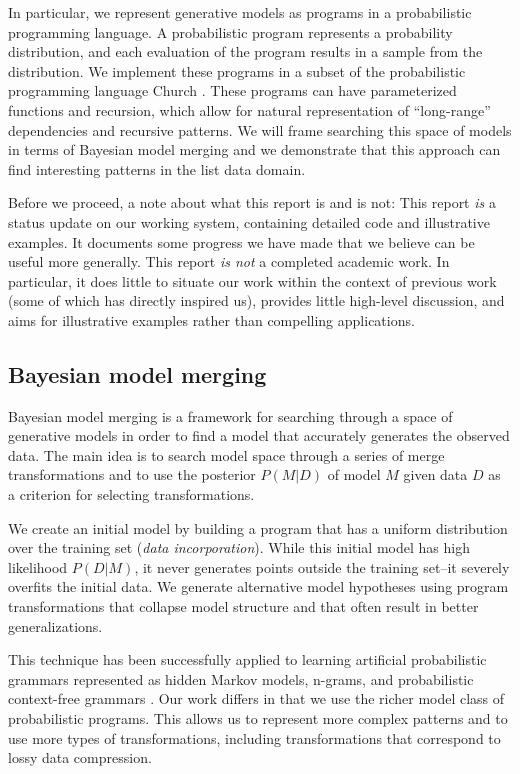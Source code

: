 \documentclass[a4paper,10pt]{article}
\begin{document}
In particular, we represent generative models as programs in a probabilistic programming language. A probabilistic program represents a probability distribution, and each evaluation of the program results in a sample from the distribution. We implement these programs in a subset of the probabilistic programming language Church \cite{N.D.Goodman:2008:f2a0d}.  
These programs can have parameterized functions and recursion, which allow for natural representation of ``long-range'' dependencies and recursive patterns.  We will frame searching this space of models in terms of Bayesian model merging \cite{Stolcke:1994:IPG:645515.658235} and we demonstrate that this approach can find interesting patterns in the list data domain.

Before we proceed, a note about what this report is and is not: This report \emph{is} a status update on our working system, containing detailed code and illustrative examples. It documents some progress we have made that we believe can be useful more generally.
This report \emph{is not} a completed academic work. In particular, it does little to situate our work within the context of previous work (some of which has  directly inspired us), provides little high-level discussion, and aims for illustrative examples rather than compelling applications.

\subsection{Bayesian model merging}

Bayesian model merging is a framework for searching through a space of generative models in order to find a model that accurately generates the observed data.  The main idea is to search model space through a series of merge transformations and to use the posterior $P(M|D)$ of model $M$ given data $D$ as a criterion for selecting transformations.

We create an initial model by building a program that has a uniform distribution over the training set ({\em data incorporation}).  While this initial model has high likelihood $P(D|M)$, it never generates points outside the training set--it severely overfits the initial data.  We generate alternative model hypotheses using program transformations that collapse model structure and that often result in better generalizations.

This technique has been successfully applied to learning artificial probabilistic grammars represented as hidden Markov models, n-grams, and probabilistic context-free grammars \cite{Stolcke:1994:IPG:645515.658235}. Our work differs in that we use the richer model class of probabilistic programs.  This allows us to represent more complex patterns and to use more types of transformations, including transformations that correspond to lossy data compression.
\end{document}
